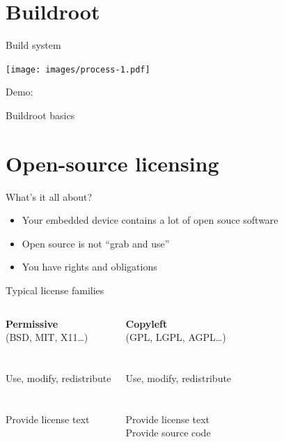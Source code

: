 \documentclass[xetex,table,table]{beamer}
\begin{document}
\section{Buildroot}

\begin{frame}{Build system}
  \begin{center}
    \texttt{[image: images/process-1.pdf]}
  \end{center}
\end{frame}

\begin{frame}[standout]
  Demo:

  Buildroot basics
\end{frame}


\section{Open-source licensing}

\begin{frame}{What's it all about?}
  \begin{itemize}
  \item Your embedded device contains a lot of open souce software
  \item Open source is not ``grab and use''
  \item You have rights and obligations
  \end{itemize}
\end{frame}

\begin{frame}{Typical license families}
  \begin{columns}

      \begin{center}
        {\bf Permissive}\\
        (BSD, MIT, X11\dots)\\
      {\ }\\
      \faCheckCircle\\
      Use, modify, redistribute\\
      {\ }\\
      \faExclamationCircle\\
      Provide license text \\
      {\ }
      \end{center}

      \begin{center}
        {\bf Copyleft} \\
        (GPL, LGPL, AGPL\dots)\\
      {\ }\\
      \faCheckCircle\\
      Use, modify, redistribute\\
      {\ }\\
      \faExclamationCircle\\
      Provide license text \\
      Provide source code
      \end{center}

  \end{columns}
\end{frame}
\end{document}

